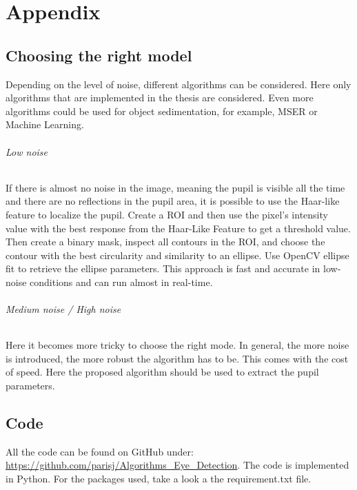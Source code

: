 \chapter{Appendix}
\label{appendix}
\section{Choosing the right model}
Depending on the level of noise, different algorithms can be considered. Here only algorithms that are implemented in the thesis are considered. Even more algorithms could be used for object sedimentation, for example, MSER or Machine Learning. 
\subparagraph{Low noise}
If there is almost no noise in the image, meaning the pupil is visible all the time and there are no reflections in the pupil area, it is possible to use the Haar-like feature to localize the pupil. Create a ROI and then use the pixel's intensity value with the best response from the Haar-Like Feature to get a threshold value. Then create a binary mask, inspect all contours in the ROI, and choose the contour with the best circularity and similarity to an ellipse. Use OpenCV ellipse fit to retrieve the ellipse parameters. This approach is fast and accurate in low-noise conditions and can run almost in real-time. 
\subparagraph{Medium noise / High noise}
Here it becomes more tricky to choose the right mode. In general, the more noise is introduced, the more robust the algorithm has to be. This comes with the cost of speed. Here the proposed algorithm should be used to extract the pupil parameters. 

\section{Code}
All the code can be found on GitHub under: \url{https://github.com/parisj/Algorithms_Eye_Detection}. The code is implemented in Python. For the packages used, take a look a the requirement.txt file.